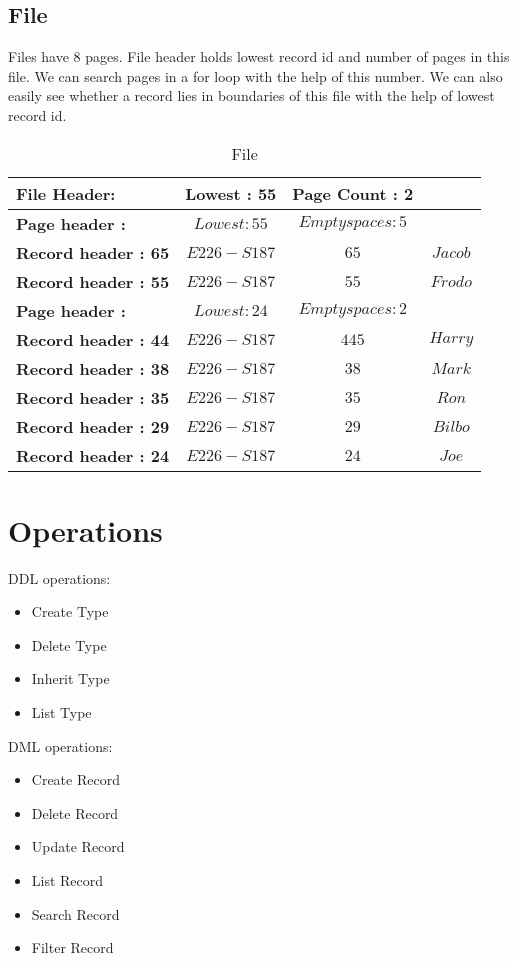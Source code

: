\documentclass{article}
\begin{document}
\subsection{File}
Files have 8 pages. File header holds lowest record id  and number of pages in this file. We can search pages in a for loop with the help of this number. We can also easily see whether a record lies in boundaries of this file with the help of lowest record id.
\begin{table}[H]
\centering
\begin{tabular}{|l|c|c|c}
\hline
\textbf{File Header:}   & \multicolumn{1}{l|}{\textbf{Lowest : 55}} & \multicolumn{1}{l|}{\textbf{Page Count : 2}} & \multicolumn{1}{l|}{\textbf{}} \\ \hline
\textbf{Page header :} & $Lowest : 55$         & $Empty spaces : 5$                     \\ \hline
\textbf{Record header : 65} & $E226 − S187$         & $65$          & $Jacob$           \\ \hline
\textbf{Record header : 55} & $E226 − S187$         & $55$          & $Frodo$           \\ \hline
\textbf{Page header :} & $Lowest : 24$         & $Empty spaces : 2$                     \\ \hline
\textbf{Record header : 44} & $E226 − S187$         & $445$          & $Harry$           \\ \hline
\textbf{Record header : 38} & $E226 − S187$         & $38$          & $Mark$           \\ \hline
\textbf{Record header : 35} & $E226 − S187$         & $35$          & $Ron$           \\ \hline
\textbf{Record header : 29} & $E226 − S187$         & $29$          & $Bilbo$           \\ \hline
\textbf{Record header : 24} & $E226 − S187$         & $24$          & $Joe$           \\ \hline
\end{tabular}
\label{tab:ex}
\caption{File}
\end{table}

\section{Operations}
\label{sec:operations}
DDL operations:
\begin{itemize}
\item Create Type
\item Delete Type
\item Inherit Type
\item List Type
\end{itemize}
DML operations:
\begin{itemize}
\item Create Record
\item Delete Record
\item Update Record
\item List Record
\item Search Record
\item Filter Record
\end{itemize}
\end{document}

